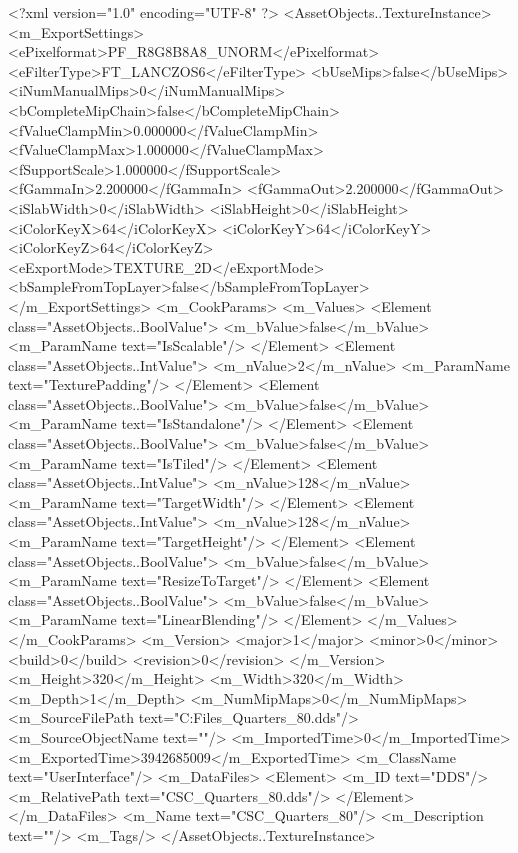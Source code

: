 <?xml version="1.0" encoding="UTF-8" ?>
<AssetObjects..TextureInstance>
	<m_ExportSettings>
		<ePixelformat>PF_R8G8B8A8_UNORM</ePixelformat>
		<eFilterType>FT_LANCZOS6</eFilterType>
		<bUseMips>false</bUseMips>
		<iNumManualMips>0</iNumManualMips>
		<bCompleteMipChain>false</bCompleteMipChain>
		<fValueClampMin>0.000000</fValueClampMin>
		<fValueClampMax>1.000000</fValueClampMax>
		<fSupportScale>1.000000</fSupportScale>
		<fGammaIn>2.200000</fGammaIn>
		<fGammaOut>2.200000</fGammaOut>
		<iSlabWidth>0</iSlabWidth>
		<iSlabHeight>0</iSlabHeight>
		<iColorKeyX>64</iColorKeyX>
		<iColorKeyY>64</iColorKeyY>
		<iColorKeyZ>64</iColorKeyZ>
		<eExportMode>TEXTURE_2D</eExportMode>
		<bSampleFromTopLayer>false</bSampleFromTopLayer>
	</m_ExportSettings>
	<m_CookParams>
		<m_Values>
			<Element class="AssetObjects..BoolValue">
				<m_bValue>false</m_bValue>
				<m_ParamName text="IsScalable"/>
			</Element>
			<Element class="AssetObjects..IntValue">
				<m_nValue>2</m_nValue>
				<m_ParamName text="TexturePadding"/>
			</Element>
			<Element class="AssetObjects..BoolValue">
				<m_bValue>false</m_bValue>
				<m_ParamName text="IsStandalone"/>
			</Element>
			<Element class="AssetObjects..BoolValue">
				<m_bValue>false</m_bValue>
				<m_ParamName text="IsTiled"/>
			</Element>
			<Element class="AssetObjects..IntValue">
				<m_nValue>128</m_nValue>
				<m_ParamName text="TargetWidth"/>
			</Element>
			<Element class="AssetObjects..IntValue">
				<m_nValue>128</m_nValue>
				<m_ParamName text="TargetHeight"/>
			</Element>
			<Element class="AssetObjects..BoolValue">
				<m_bValue>false</m_bValue>
				<m_ParamName text="ResizeToTarget"/>
			</Element>
			<Element class="AssetObjects..BoolValue">
				<m_bValue>false</m_bValue>
				<m_ParamName text="LinearBlending"/>
			</Element>
		</m_Values>
	</m_CookParams>
	<m_Version>
		<major>1</major>
		<minor>0</minor>
		<build>0</build>
		<revision>0</revision>
	</m_Version>
	<m_Height>320</m_Height>
	<m_Width>320</m_Width>
	<m_Depth>1</m_Depth>
	<m_NumMipMaps>0</m_NumMipMaps>
	<m_SourceFilePath text="C:\Users\Shadow\Desktop\Working Files\Icons\Quarters\CSC_Quarters_80.dds"/>
	<m_SourceObjectName text=""/>
	<m_ImportedTime>0</m_ImportedTime>
	<m_ExportedTime>3942685009</m_ExportedTime>
	<m_ClassName text="UserInterface"/>
	<m_DataFiles>
		<Element>
			<m_ID text="DDS"/>
			<m_RelativePath text="CSC_Quarters_80.dds"/>
		</Element>
	</m_DataFiles>
	<m_Name text="CSC_Quarters_80"/>
	<m_Description text=""/>
	<m_Tags/>
</AssetObjects..TextureInstance>

